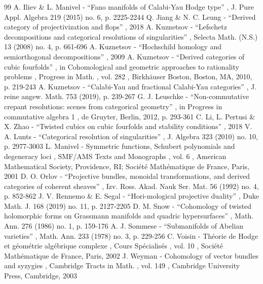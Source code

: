 \documentclass[11pt]{article}
\theoremstyle{plain}
\theoremstyle{definition}
\begin{document}
\begin{thebibliography}{99}
 A. Iliev \& L. Manivel - “Fano manifolds of Calabi-Yau Hodge type” , J. Pure Appl. Algebra 219 (2015) no. 6, p. 2225-2244
 Q. Jiang \& N. C. Leung - “Derived category of projectivization and flops” , 2018
 A. Kuznetsov - “Lefschetz decompositions and categorical resolutions of singularities” , Selecta Math. (N.S.) 13 (2008) no. 4, p. 661-696
 A. Kuznetsov - “Hochschild homology and semiorthogonal decompositions” , 2009
 A. Kuznetsov - “Derived categories of cubic fourfolds” , in Cohomological and geometric approaches to rationality problems , Progress in Math. , vol. 282 , Birkhäuser Boston, Boston, MA, 2010, p. 219-243
 A. Kuznetsov - “Calabi-Yau and fractional Calabi-Yau categories” , J. reine angew. Math. 753 (2019), p. 239-267
 G. J. Leuschke - “Non-commutative crepant resolutions: scenes from categorical geometry” , in Progress in commutative algebra 1 , de Gruyter, Berlin, 2012, p. 293-361
 C. Li, L. Pertusi \& X. Zhao - “Twisted cubics on cubic fourfolds and stability conditions” , 2018
 V. A. Lunts - “Categorical resolution of singularities” , J. Algebra 323 (2010) no. 10, p. 2977-3003
 L. Manivel - Symmetric functions, Schubert polynomials and degeneracy loci , SMF/AMS Texts and Monographs , vol. 6 , American Mathematical Society, Providence, RI; Société Mathématique de France, Paris, 2001
 D. O. Orlov - “Projective bundles, monoidal transformations, and derived categories of coherent sheaves” , Izv. Ross. Akad. Nauk Ser. Mat. 56 (1992) no. 4, p. 852-862
 J. V. Rennemo \& E. Segal - “Hori-mological projective duality” , Duke Math. J. 168 (2019) no. 11, p. 2127-2205
 D. M. Snow - “Cohomology of twisted holomorphic forms on Grassmann manifolds and quadric hypersurfaces” , Math. Ann. 276 (1986) no. 1, p. 159-176
 A. J. Sommese - “Submanifolds of Abelian varieties” , Math. Ann. 233 (1978) no. 3, p. 229-256
 C. Voisin - Théorie de Hodge et géométrie algébrique complexe , Cours Spécialisés , vol. 10 , Société Mathématique de France, Paris, 2002
 J. Weyman - Cohomology of vector bundles and syzygies , Cambridge Tracts in Math. , vol. 149 , Cambridge University Press, Cambridge, 2003
\end{thebibliography}
\end{document}

